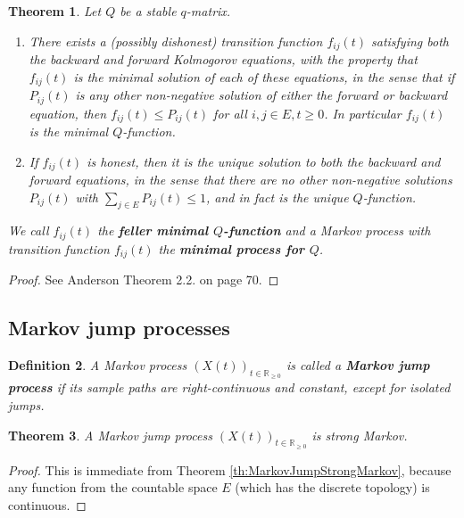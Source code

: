 \documentclass[12pt,a4paper]{scrartcl}
\newtheorem{theorem}{Theorem}[section]
\newtheorem{definition}[theorem]{Definition}
\numberwithin{equation}{section}
\newcommand{\R}{\mathbb{R}} %
\begin{document}
\begin{theorem}
Let $ Q $ be a stable $q$-matrix. 
\begin{enumerate}
\item There exists a (possibly dishonest) transition function $ f_{ij}\left(t\right) $ satisfying both the backward and forward Kolmogorov equations, with the property that $ f_{ij}\left(t\right) $ is the minimal solution of each of these equations, in the sense that if $ P_{ij}\left(t\right) $ is any other non-negative solution of either the forward or backward equation, then $ f_{ij}\left(t\right) \leq P_{ij}\left(t\right) $ for all $ i,j \in E, t\geq 0$. In particular $ f_{ij}\left(t\right) $ is the minimal $Q$-function.
\item If $ f_{ij}\left(t\right) $ is honest, then it is the unique solution to both the backward and forward equations, in the sense that there are no other non-negative solutions $P_{ij}\left(t\right)$ with $\sum_{j \in E} P_{ij}\left(t\right) \leq 1 $, and in fact is the unique $Q$-function.
\end{enumerate}
We call $f_{ij}\left(t\right)$ the \textbf{feller minimal $Q$-function} and a Markov process with transition function $f_{ij}\left(t\right)$ the \textbf{minimal process for $Q$}.
\end{theorem}
\begin{proof}
See Anderson \cite{anderson} Theorem 2.2. on page 70.
\end{proof}

\subsection{Markov jump processes}



\begin{definition}
A Markov process $\left(X\left(t\right)\right)_{t \in \R_{\geq 0}}$ is called a \textbf{Markov jump process} if its sample paths are right-continuous and constant, except for isolated jumps.
\end{definition}

\begin{theorem}
A Markov jump process $\left(X\left(t\right)\right)_{t \in \R_{\geq 0}}$ is strong Markov.
\end{theorem}

\begin{proof}
This is immediate from Theorem \ref{th:MarkovJumpStrongMarkov}, because any function from the countable space $E$ (which has the discrete topology) is continuous.
\end{proof}
\end{document}
